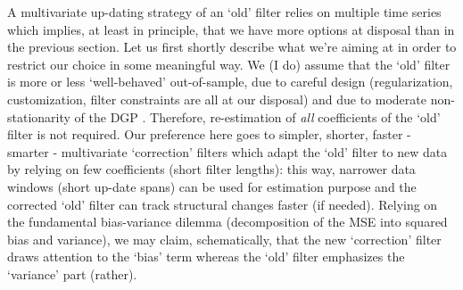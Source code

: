 \documentclass[11pt]{article}
\begin{document}
A multivariate up-dating strategy of an `old' filter relies on multiple time series which implies, at least in principle, that we have more options at disposal than in the previous section. Let us first shortly describe what we're aiming at in order to restrict our choice in some meaningful way. We (I do) assume that the `old' filter is more or less `well-behaved' out-of-sample, due to careful design (regularization, customization, filter constraints are all at our disposal) and due to moderate non-stationarity of the DGP%
. Therefore, re-estimation of \emph{all} coefficients of the `old' filter is not required. Our preference here goes to simpler, shorter, faster - smarter - multivariate `correction' filters which adapt the `old' filter to new data by relying on few coefficients (short filter lengths): this way, narrower data windows (short up-date spans) can be used for estimation purpose and the corrected `old' filter can track structural changes faster (if needed). Relying on the fundamental bias-variance dilemma (decomposition of the MSE into squared bias and variance), we may claim, schematically, that the new `correction' filter draws attention to the `bias' term whereas the `old' filter emphasizes the `variance' part (rather). \\
\end{document}
